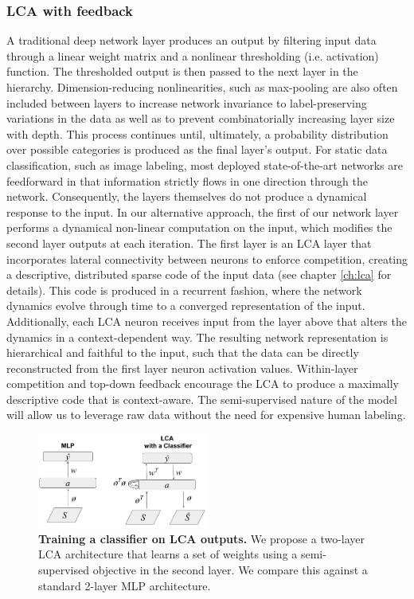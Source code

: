 \subsubsection{LCA with feedback}
A traditional deep network layer produces an output by filtering input data through a linear weight matrix and a nonlinear thresholding (i.e. activation) function. The thresholded output is then passed to the next layer in the hierarchy. Dimension-reducing nonlinearities, such as max-pooling are also often included between layers to increase network invariance to label-preserving variations in the data as well as to prevent combinatorially increasing layer size with depth. This process continues until, ultimately, a probability distribution over possible categories is produced as the final layer’s output. For static data classification, such as image labeling, most deployed state-of-the-art networks are feedforward in that information strictly flows in one direction through the network. Consequently, the layers themselves do not produce a dynamical response to the input. In our alternative approach, the first of our network layer performs a dynamical non-linear computation on the input, which modifies the second layer outputs at each iteration. The first layer is an LCA layer that incorporates lateral connectivity between neurons to enforce competition, creating a descriptive, distributed sparse code of the input data (see chapter \ref{ch:lca} for details). This code is produced in a recurrent fashion, where the network dynamics evolve through time to a converged representation of the input. Additionally, each LCA neuron receives input from the layer above that alters the dynamics in a context-dependent way. The resulting network representation is hierarchical and faithful to the input, such that the data can be directly reconstructed from the first layer neuron activation values. Within-layer competition and top-down feedback encourage the LCA to produce a maximally descriptive code that is context-aware. The semi-supervised nature of the model will allow us to leverage raw data without the need for expensive human labeling.

\begin{figure}[h]
    \centering
    \includegraphics[width=0.5\textwidth]{figures/mlp_lcaf_architectures.png}
    \caption{\textbf{Training a classifier on LCA outputs.} We propose a two-layer LCA architecture that learns a set of weights using a semi-supervised objective in the second layer. We compare this against a standard 2-layer MLP architecture.}
    \label{fig:ch3_mlp_lcaf_architectures}
\end{figure}

